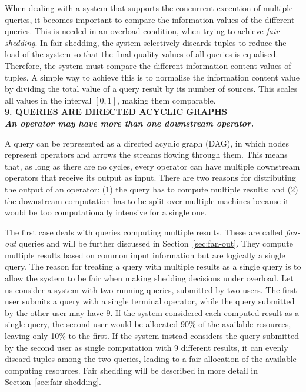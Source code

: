 	When dealing with a system that supports the concurrent execution of multiple queries, it becomes
	important to compare the information values of the different queries. This is needed in
	an overload condition, when trying to achieve \textit{fair shedding}. In fair shedding, the system
	selectively discards tuples to reduce the load of the system so that the final quality values of all
	queries is equalised.
	Therefore, the system must compare the different information content values of tuples. A simple
	way to achieve this is to normalise the information content value by dividing the total
	value of a query result by its number of sources.
	This scales all values in the interval $[0,1]$, making them comparable.\\

\textbf{9. QUERIES ARE DIRECTED ACYCLIC GRAPHS \\ \textit{An operator may have more than one downstream
operator.}}

	A query can be represented as a directed acyclic graph (DAG), in which nodes represent operators and
	arrows the streams flowing through them. This means that, as long as there are no cycles, every operator
	can have multiple downstream operators that receive its output as input. There are two reasons for
	distributing the output of an operator: (1) the query has to compute multiple results; and (2) the
	downstream computation has to be split over multiple machines because it would be too computationally
	intensive for a single one.
	
The first case deals with queries computing multiple results. These are called \textit{fan-out} queries
and will be further discussed in Section~\ref{sec:fan-out}. They compute multiple results based on common
input information but are logically a single query. The reason for treating a query with multiple results
as a single query is to allow the system to be fair when making shedding decisions under overload.
Let us consider a system with two running queries, submitted by two users. The first user submits a
query with a single terminal operator, while the query submitted by the other user may have $9$.
If the system considered each computed result as a single query, the second user would be allocated 90\%
of the available resources, leaving only 10\% to the first. If the system instead considers the query
submitted by the second user as single computation with $9$ different results, it can evenly discard
tuples among the two queries, leading to a fair allocation of the available computing resources.
Fair shedding will be described in more detail in Section~\ref{sec:fair-shedding}.
	
